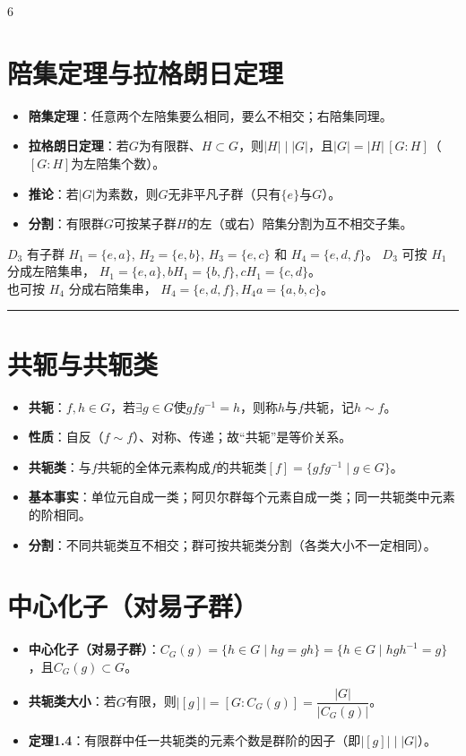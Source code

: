 \documentclass[landscape]{article}
\begin{document}
\begin{multicols*}{6}
\section*{陪集定理与拉格朗日定理}
\begin{itemize}
  \item \textbf{陪集定理}：任意两个左陪集要么相同，要么不相交；右陪集同理。
  \item \textbf{拉格朗日定理}：若$G$为有限群、$H\subset G$，则$|H|\mid |G|$，且$|G|=|H|\,[G\!:\!H]$（$[G\!:\!H]$为左陪集个数）。
  \item \textbf{推论}：若$|G|$为素数，则$G$无非平凡子群（只有$\{e\}$与$G$）。
  \item \textbf{分割}：有限群$G$可按某子群$H$的左（或右）陪集分割为互不相交子集。
\end{itemize}

$D_3$ 有子群 $H_1=\{e, a\}$, $H_2=\{e, b\}$, $H_3=\{e, c\}$ 和 $H_4=\{e, d, f\}$。
\noindent $D_3$ 可按 $H_1$ 分成左陪集串， $H_1=\{e, a\}, bH_1=\{b, f\}, cH_1=\{c, d\}$。\\
也可按 $H_4$ 分成右陪集串， $H_4=\{e, d, f\}, H_4a=\{a, b, c\}$。
\noindent\textcolor{red}{\rule{\linewidth}{1pt}}
\section*{共轭与共轭类}
\begin{itemize}
  \item \textbf{共轭}：$f,h\in G$，若$\exists g\in G$使$gfg^{-1}=h$，则称$h$与$f$共轭，记$h\sim f$。
  \item \textbf{性质}：自反（$f\sim f$）、对称、传递；故“共轭”是等价关系。
  \item \textbf{共轭类}：与$ f $共轭的全体元素构成$ f $的共轭类$[f]=\{gfg^{-1}\mid g\in G\}$。
  \item \textbf{基本事实}：单位元自成一类；阿贝尔群每个元素自成一类；同一共轭类中元素的阶相同。
  \item \textbf{分割}：不同共轭类互不相交；群可按共轭类分割（各类大小不一定相同）。
\end{itemize}

\section*{中心化子（对易子群）}
\begin{itemize}
  \item \textbf{中心化子（对易子群）}：$C_G(g)=\{h\in G\mid hg=gh\}=\{h\in G\mid hgh^{-1}=g\}$，且$C_G(g)\subset G$。
  \item \textbf{共轭类大小}：若$G$有限，则$|[g]|=[G:C_G(g)]=\dfrac{|G|}{|C_G(g)|}$。
  \item \textbf{定理1.4}：有限群中任一共轭类的元素个数是群阶的因子（即$|[g]|\mid |G|$）。
\end{itemize}


\end{multicols*}
\end{document}
